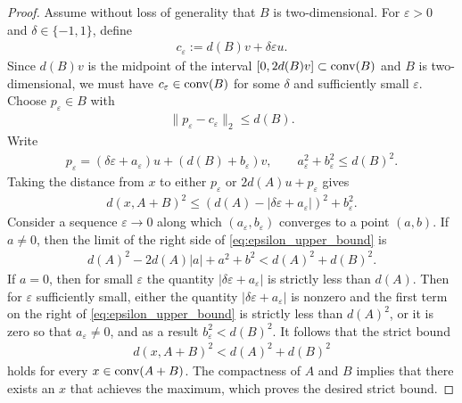 \documentclass[11pt]{article}
\begin{document}
\begin{proof}
    Assume without loss of generality that $B$ is two-dimensional. For $\varepsilon>0$ and $\delta\in \{-1,1\}$, define 
    \begin{align*}
        c_{\varepsilon}:=d(B)v+\delta\varepsilon u.
    \end{align*}
    Since $d(B)v$ is the midpoint of the interval $[0,2d(B)v]\subset \textup{conv}(B)$ and $B$ is two-dimensional, we must have $c_\varepsilon\in \textup{conv}(B)$ for some $\delta$ and sufficiently small $\varepsilon$. Choose $p_{\varepsilon}\in B$ with 
    \begin{align*}
        \|p_\varepsilon-c_\varepsilon\|_2\leq d(B).
    \end{align*}
    Write 
    \begin{align*}
        p_\varepsilon=(\delta\varepsilon+a_\varepsilon)u+(d(B)+b_\varepsilon)v,\qquad a_\varepsilon^2+b_\varepsilon^2\leq d(B)^2.
    \end{align*}
    Taking the distance from $x$ to either $p_\varepsilon$ or $2d(A)u+p_\varepsilon$ gives
    \begin{align}\label{eq:epsilon_upper_bound}
        d(x,A+B)^2\leq (d(A)-|\delta\varepsilon +a_\varepsilon|)^2+b_\varepsilon^2.
    \end{align}
    Consider a sequence $\varepsilon\rightarrow 0$ along which $(a_\varepsilon,b_\varepsilon)$ converges to a point $(a,b)$. If $a\neq 0$, then the limit of the right side of \eqref{eq:epsilon_upper_bound} is
    \begin{align*}
        d(A)^2-2d(A)|a|+a^2+b^2<d(A)^2+d(B)^2.
    \end{align*}
    If $a= 0$, then for small $\varepsilon$ the quantity $|\delta\varepsilon +a_\varepsilon|$ is strictly less than $d(A)$. Then for $\varepsilon$ sufficiently small, either the quantity $|\delta\varepsilon +a_\varepsilon|$ is nonzero and the first term on the right of \eqref{eq:epsilon_upper_bound} is strictly less than $d(A)^2$, or it is zero so that $a_\varepsilon\neq 0$, and as a result $b_{\varepsilon}^2<d(B)^2$. It follows that the strict bound
    \begin{align*}
        d(x,A+B)^2<d(A)^2+d(B)^2
    \end{align*}
    holds for every $x\in \textup{conv}(A+B)$. The compactness of $A$ and $B$ implies that there exists an $x$ that achieves the maximum, which proves the desired strict bound.
\end{proof}
\end{document}
